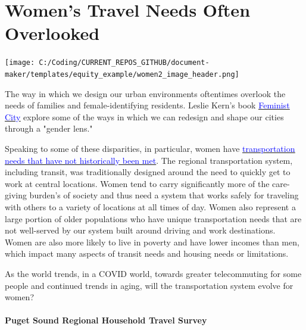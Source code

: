 \documentclass[
  12pt,
]{article}
\author{}
\date{\vspace{-2.5em}}
\begin{document}
\setmainfont{Poppins}

\hypertarget{womens-travel-needs-often-overlooked}{%
\section{Women's Travel Needs Often
Overlooked}\label{womens-travel-needs-often-overlooked}}

\texttt{[image: C:/Coding/CURRENT\_REPOS\_GITHUB/document-maker/templates/equity\_example/women2\_image\_header.png]}

\begin{flushleft}
The way in which we design our urban environments oftentimes overlook the needs of families and female-identifying residents. Leslie Kern's book \href{https://metropolismag.com/viewpoints/leslie-kern-feminist-city/}{\underline{\textcolor{blue}{Feminist City}}} explore some of the ways in which we can redesign and shape our cities through a "gender lens." \medskip


Speaking to some of these disparities, in particular, women have \href{http://libraryarchives.metro.net/DB_Attachments/2019-0294/UnderstandingHowWomenTravel_FullReport_FINAL.pdf}{\underline{\textcolor{blue}{transportation needs that have not historically been met}}}. The regional transportation system, including transit, was traditionally designed around the need to quickly get to work at central locations. Women tend to carry significantly more of the care-giving burden's of society and thus need a system that works safely for traveling with others to a variety of locations at all times of day. Women also represent a large portion of older populations who have unique transportation needs that are not well-served by our system built around driving and work destinations. Women are also more likely to live in poverty and have lower incomes than men, which impact many aspects of transit needs and housing needs or limitations.\medskip


As the world trends, in a COVID world, towards greater telecommuting for some people and continued trends in aging, will the transportation system evolve for women?
\end{flushleft}

\hypertarget{puget-sound-regional-household-travel-survey}{%
\paragraph{Puget Sound Regional Household Travel
Survey}\label{puget-sound-regional-household-travel-survey}}
\end{document}
